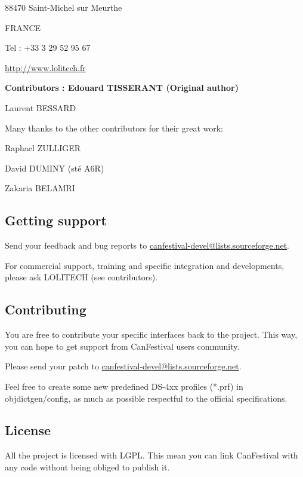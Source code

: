\documentclass[a4paper,12pt]{book}
\begin{document}
88470 Saint{}-Michel sur Meurthe

FRANCE

Tel : +33 3 29 52 95 67

\href{http://www.lolitech.fr/}{http://www.lolitech.fr}

{\bfseries
Contributors : \textmd{Edouard TISSERANT (Original author)}}

{\mdseries
   Laurent BESSARD}


\bigskip

Many thanks to the other contributors for their great work:

\textmd{   }Raphael ZULLIGER

\textmd{   }David DUMINY (st\'e A6R)

\textmd{   }Zakaria BELAMRI

\subsection{Getting support}
Send your feedback and bug reports to
\href{mailto:canfestival-devel@lists.sourceforge.net}{canfestival{}-devel@lists.sourceforge.net}.

For commercial support, \space training and specific integration and
developments, please ask LOLITECH (see contributors).

\subsection{Contributing}
You are free to contribute your specific interfaces back to the project.
This way, you can hope to get support from CanFestival users community.

Please send your patch to
\href{mailto:canfestival-devel@lists.sourceforge.net}{canfestival{}-devel@lists.sourceforge.net}.

Feel free to create some new predefined DS{}-4xx profiles (*.prf) in
objdictgen/config, as much as possible respectful to the official
specifications.

\subsection{License}
All the project is licensed with LGPL. This mean you can link
CanFestival with any code without being obliged to publish it.
\end{document}
